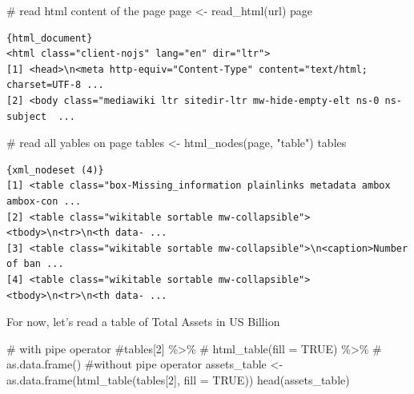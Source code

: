 \documentclass[
  letterpaper,
  DIV=11,
  numbers=noendperiod]{scrreprt}
\newenvironment{Shaded}{\begin{snugshade}}{\end{snugshade}}
\newcommand{\AttributeTok}[1]{\textcolor[rgb]{0.40,0.45,0.13}{#1}}
\newcommand{\CommentTok}[1]{\textcolor[rgb]{0.37,0.37,0.37}{#1}}
\newcommand{\ConstantTok}[1]{\textcolor[rgb]{0.56,0.35,0.01}{#1}}
\newcommand{\DecValTok}[1]{\textcolor[rgb]{0.68,0.00,0.00}{#1}}
\newcommand{\FunctionTok}[1]{\textcolor[rgb]{0.28,0.35,0.67}{#1}}
\newcommand{\NormalTok}[1]{\textcolor[rgb]{0.00,0.23,0.31}{#1}}
\newcommand{\OtherTok}[1]{\textcolor[rgb]{0.00,0.23,0.31}{#1}}
\newcommand{\StringTok}[1]{\textcolor[rgb]{0.13,0.47,0.30}{#1}}
\begin{document}
\begin{Shaded}
\begin{Highlighting}[]
\CommentTok{\# read html content of the page}
\NormalTok{page }\OtherTok{\textless{}{-}} \FunctionTok{read\_html}\NormalTok{(url)}
\NormalTok{page}
\end{Highlighting}
\end{Shaded}

\begin{verbatim}
{html_document}
<html class="client-nojs" lang="en" dir="ltr">
[1] <head>\n<meta http-equiv="Content-Type" content="text/html; charset=UTF-8 ...
[2] <body class="mediawiki ltr sitedir-ltr mw-hide-empty-elt ns-0 ns-subject  ...
\end{verbatim}

\begin{Shaded}
\begin{Highlighting}[]
\CommentTok{\# read all yables on page}
\NormalTok{tables }\OtherTok{\textless{}{-}} \FunctionTok{html\_nodes}\NormalTok{(page, }\StringTok{"table"}\NormalTok{)}
\NormalTok{tables}
\end{Highlighting}
\end{Shaded}

\begin{verbatim}
{xml_nodeset (4)}
[1] <table class="box-Missing_information plainlinks metadata ambox ambox-con ...
[2] <table class="wikitable sortable mw-collapsible"><tbody>\n<tr>\n<th data- ...
[3] <table class="wikitable sortable mw-collapsible">\n<caption>Number of ban ...
[4] <table class="wikitable sortable mw-collapsible"><tbody>\n<tr>\n<th data- ...
\end{verbatim}

For now, let's read a table of Total Assets in US Billion

\begin{Shaded}
\begin{Highlighting}[]
\CommentTok{\# with pipe operator}
\CommentTok{\#tables[2] \%\textgreater{}\% }
 \CommentTok{\#   html\_table(fill = TRUE) \%\textgreater{}\% }
 \CommentTok{\#   as.data.frame()}
\CommentTok{\#without pipe operator}
\NormalTok{assets\_table }\OtherTok{\textless{}{-}} \FunctionTok{as.data.frame}\NormalTok{(}\FunctionTok{html\_table}\NormalTok{(tables[}\DecValTok{2}\NormalTok{], }\AttributeTok{fill =} \ConstantTok{TRUE}\NormalTok{))   }
\FunctionTok{head}\NormalTok{(assets\_table)}
\end{Highlighting}
\end{Shaded}
\end{document}
